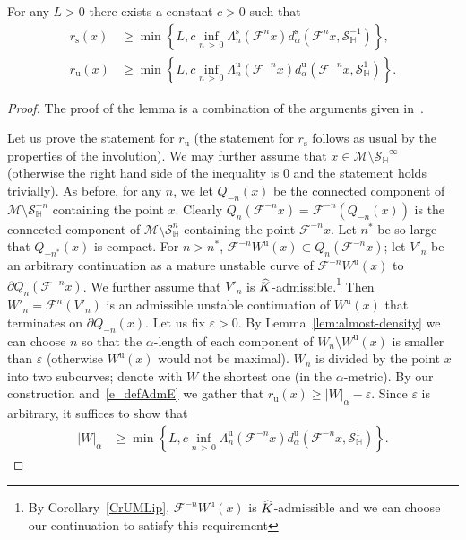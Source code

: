 \documentclass[AHL, Unicode, longabstracts,published]{cedram}
\newcommand{\eps}{\varepsilon}
\newcommand{\unstable}{\text{u}}
\newcommand{\stable}{\text{s}}
\newcommand{\homo}{\mathbb{H}}
\newcommand{\cm}{\mathcal{F}}
\newcommand{\csp}{\mathcal{M}}
\newcommand{\Wu}{W^{\unstable}}
\newcommand{\dadmPrivate}{d\adm}
\newcommand{\ds}{\dadmPrivate^{\stable}}
\newcommand{\du}{\dadmPrivate^{\unstable}}
\newcommand{\rs}{r_{\stable}}
\newcommand{\ru}{r_{\unstable}}
\newcommand{\singPrivate}{\mathcal{S}}
\newcommand{\hsing}[1]{{\singPrivate}_\homo^{#1}}
\newcommand{\admiss}{admissible}
\newcommand{\adm}{_{\alpha^{+}}}
\newcommand{\admName}{\alpha^{+}}
\renewcommand{\admName}{\alpha}
\renewcommand{\adm}{_{\alpha}}
\let\oldhat\hat
\renewcommand*{\hat}[1]{\mathchoice{\widehat{#1}}{\widehat{#1}}{\oldhat{#1}}{\oldhat{#1}}}
\begin{document}
\begin{lemm} \label{PrSize}
For any $L > 0$ there exists a constant $c > 0$ such that
\begin{align*}
\rs(x)&\geq \min\left\{L,c \inf_{n\, >\,0} \Lambda_{n}^{\stable}\left(\cm^{n}x\right) \ds\left(\cm^{n}x, \hsing{-1}\right)\right\},\\
\ru(x)&\geq \min\left\{L,c \inf_{n\,>\,0} \Lambda_{n}^{\unstable}\left(\cm^{-n}x\right) \du\left(\cm^{-n}x, \hsing{1}\right)\right\}.
\end{align*}
\end{lemm}
\begin{proof}
The proof of the lemma is a combination of the arguments given in~\cite[Lemma~4.67, (4.61), Exercise~5.19 and (5.58)]{ChM}.

Let us prove the statement for $\ru$ (the statement for $\rs$ follows as usual by the properties of the involution). We may further assume that $x\in\csp\setminus\hsing{-\infty}$ (otherwise the right hand side of the inequality is $0$ and the statement holds trivially). As before, for any $n$, we let $Q_{-n}(x)$ be the connected component of $\csp\setminus\hsing{-n}$ containing the point $x$. Clearly $Q_n(\cm^{-n}x) = \cm^{-n}(Q_{-n}(x))$ is the connected component of $\csp\setminus\hsing{n}$ containing the point $\cm^{-n}x$. Let $n^{*}$ be so large that $\overline{Q_{-n^{*}}(x)}$ is compact. For $n > n^{*}$, $\cm^{-n}\Wu(x)\subset Q_{n}(\cm^{-n}x)$; let $V'_{n}$ be an arbitrary continuation as a mature unstable curve of $\cm^{-n}\Wu(x)$ to $\partial Q_{n}(\cm^{-n}x)$. We further assume that $V'_{n}$ is $\hat K$-\admiss{}.\footnote{By Corollary~\ref{CrUMLip}, $\cm^{-n}\Wu(x)$ is $\hat K$-\admiss{} and we can choose our continuation to satisfy this requirement} Then $W'_{n} = \cm^{n}(V'_{n})$ is an admissible unstable continuation of $\Wu(x)$ that terminates on $\partial Q_{-n}(x)$. Let us fix $\eps > 0$. By Lemma~\ref{lem:almost-density} we can choose $n$ so that the $\admName$-length of each component of $W_{n}\setminus \Wu(x)$ is smaller than $\eps$ (otherwise $\Wu(x)$ would not be maximal). $W_{n}$ is divided by the point $x$ into two subcurves; denote with $W$ the shortest one (in the $\admName$-metric). By our construction and~\eqref{e_defAdmE} we gather that $\ru(x)\ge |W|\adm- \eps$. Since $\eps$ is arbitrary, it suffices to show that
\begin{align*}
|W|\adm &\geq \min\left\{L,c \inf_{n\,>\,0} \Lambda_{n}^{\unstable}(\cm^{-n}x) \du\left(\cm^{-n}x, \hsing{1}\right)\right\}.
\end{align*}


\end{proof}
\end{document}
